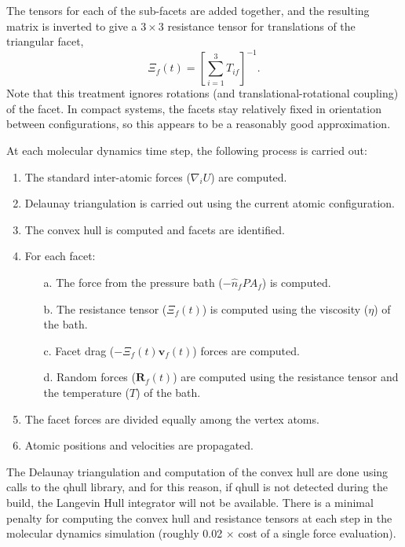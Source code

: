 \documentclass[letterpaper]{report}
\begin{document}
The tensors for each of the sub-facets are added together, and the
resulting matrix is inverted to give a $3 \times 3$ resistance tensor
for translations of the triangular facet,
\begin{equation}
\Xi_f(t) =\left[\sum_{i=1}^3 T_{if}\right]^{-1}.
\end{equation}
Note that this treatment ignores rotations (and
translational-rotational coupling) of the facet.  In compact systems,
the facets stay relatively fixed in orientation between
configurations, so this appears to be a reasonably good approximation.

At each
molecular dynamics time step, the following process is carried out:
\begin{enumerate}
\item The standard inter-atomic forces ($\nabla_iU$) are computed.
\item Delaunay triangulation is carried out using the current atomic
  configuration.
\item The convex hull is computed and facets are identified.
\item For each facet:
\begin{itemize}
\item[a.] The force from the pressure bath ($-\hat{n}_fPA_f$) is
  computed.
\item[b.] The resistance tensor ($\Xi_f(t)$) is computed using the
  viscosity ($\eta$) of the bath.
\item[c.] Facet drag ($-\Xi_f(t) \mathbf{v}_f(t)$) forces are
  computed.
\item[d.] Random forces ($\mathbf{R}_f(t)$) are computed using the
  resistance tensor and the temperature ($T$) of the bath.
\end{itemize}
\item The facet forces are divided equally among the vertex atoms.
\item Atomic positions and velocities are propagated.
\end{enumerate}
The Delaunay triangulation and computation of the convex hull are done
using calls to the qhull library,\cite{Qhull} and for this reason, if
qhull is not detected during the build, the Langevin Hull integrator
will not be available.  There is a minimal penalty for computing the
convex hull and resistance tensors at each step in the molecular
dynamics simulation (roughly 0.02 $\times$ cost of a single force
evaluation).
\end{document}
